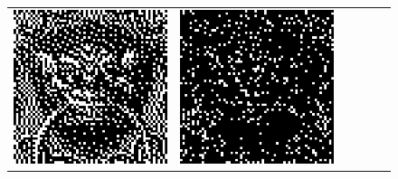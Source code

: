 \begin{figure}
	\footnotesize
	\centering
	\setlength{\tilewidth}{0.15\textwidth}
	\setlength{\tabcolsep}{2.75pt}
	\begin{tabular}{c c c c c c}%
		\includegraphics[width=\tilewidth,interpolate=false]{media/chp2/associative_memory/binam/00_00_orig_scaled_crushed.png}&%
		\includegraphics[width=\tilewidth,interpolate=false]{media/chp2/associative_memory/binam/00_01_noise_scaled_crushed.png}&%

\end{tabular}
\end{figure}
